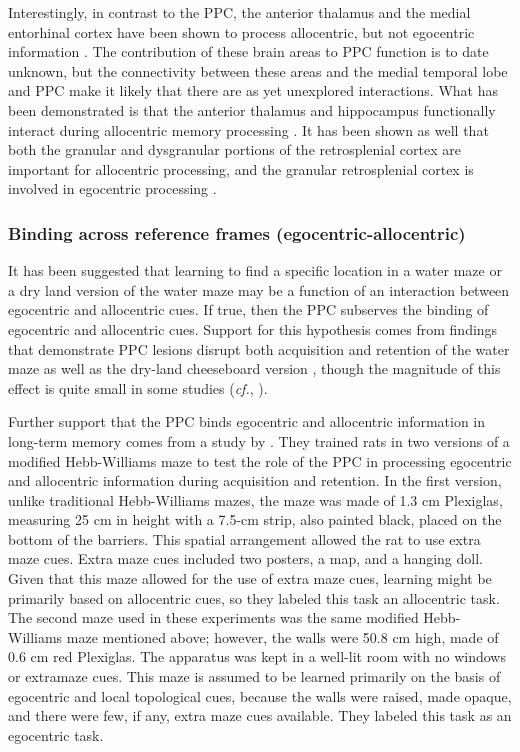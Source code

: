 \documentclass[doc, longtable]{apa6}
\begin{document}
Interestingly, in contrast to the PPC, the anterior thalamus and the medial entorhinal cortex have been shown to process allocentric, but not egocentric information \parencite{warburton1997assessing}. The contribution of these brain areas to PPC function is to date unknown, but the connectivity between these areas and the medial temporal lobe and PPC make it likely that there are as yet unexplored interactions. What has been demonstrated is that the anterior thalamus and hippocampus functionally interact during allocentric memory processing \parencite{Warburton2001a}. It has been shown as well that both the granular and dysgranular portions of the retrosplenial cortex are important for allocentric processing, and the granular retrosplenial cortex is involved in egocentric processing \parencite{Pothuizen2009a}.

\subsubsection{Binding across reference frames (egocentric-allocentric)}
It has been suggested that learning to find a specific location in a water maze or a dry land version of the water maze may be a function of an interaction between egocentric and allocentric cues. If true, then the PPC subserves the binding of egocentric and allocentric cues. Support for this hypothesis comes from findings that demonstrate PPC lesions disrupt both acquisition and retention of the water maze as well as the dry-land cheeseboard version \parencite{DiMattia1988a, Kesner1991a, Kolb1987a}, though the magnitude of this effect is quite small in some studies (\textit{cf.}, \cite{Kolb1983a, Save1996a}). 
	
Further support that the PPC binds egocentric and allocentric information in long-term memory comes from a study by \textcite{Rogers2007a}. They trained rats in two versions of a modified Hebb-Williams maze to test the role of the PPC in processing egocentric and allocentric information during acquisition and retention. In the first version, unlike traditional Hebb-Williams mazes, the maze was made of 1.3 cm Plexiglas, measuring 25 cm in height with a 7.5-cm strip, also painted black, placed on the bottom of the barriers. This spatial arrangement allowed the rat to use extra maze cues. Extra maze cues included two posters, a map, and a hanging doll. Given that this maze allowed for the use of extra maze cues, learning might be primarily based on allocentric cues, so they labeled this task an allocentric task. The second maze used in these experiments was the same modified Hebb-Williams maze mentioned above; however, the walls were 50.8 cm high, made of 0.6 cm red Plexiglas. The apparatus was kept in a well-lit room with no windows or extramaze cues. This maze is assumed to be learned primarily on the basis of egocentric and local topological cues, because the walls were raised, made opaque, and there were few, if any, extra maze cues available. They labeled this task as an egocentric task. 
	
\end{document}
